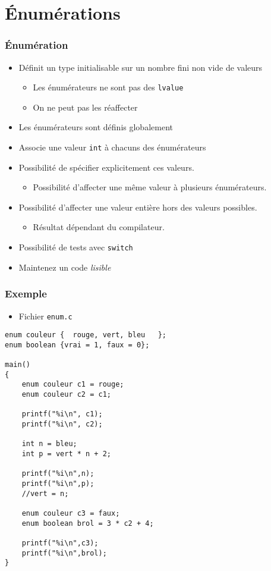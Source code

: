 \section{Énumérations}

\begin{frame}
\frametitle{Énumération}
\begin{itemize}[<+->]
\item Définit un type initialisable sur un nombre fini non vide de valeurs
	\begin{itemize}
	\item Les énumérateurs ne sont pas des \texttt{lvalue}
	\item On ne peut pas les réaffecter
	\end{itemize}
\item Les énumérateurs sont définis globalement
\item Associe une valeur \lstinline|int| à chacuns des énumérateurs
\item Possibilité de spécifier explicitement ces valeurs.
	\begin{itemize}
	\item Possibilité d'affecter une même valeur à plusieurs énumérateurs.
	\end{itemize}
\item Possibilité d'affecter une valeur entière hors des valeurs possibles.
	\begin{itemize}
	\item Résultat dépendant du compilateur.
	\end{itemize}
\item Possibilité de tests avec \lstinline|switch|
\item Maintenez un code \emph{lisible}
\end{itemize}
\end{frame}

\begin{frame}[containsverbatim]
\frametitle{Exemple}
\begin{itemize}
\item Fichier \texttt{enum.c}
\end{itemize}
\begin{lstlisting}
enum couleur {	rouge, vert, bleu   };
enum boolean {vrai = 1, faux = 0};

main()
{
	enum couleur c1 = rouge;
	enum couleur c2 = c1;

	printf("%i\n", c1);
	printf("%i\n", c2);

	int n = bleu;
	int p = vert * n + 2;

	printf("%i\n",n);
	printf("%i\n",p);
	//vert = n;
	
	enum couleur c3 = faux;
	enum boolean brol = 3 * c2 + 4;

	printf("%i\n",c3);
	printf("%i\n",brol);
}
\end{lstlisting}
\end{frame}

